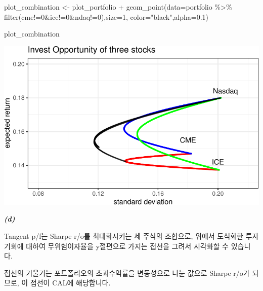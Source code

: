 \documentclass[
  a4paper,
  DIV=11,
  numbers=noendperiod]{scrreprt}
\newenvironment{Shaded}{\begin{snugshade}}{\end{snugshade}}
\newcommand{\AttributeTok}[1]{\textcolor[rgb]{0.40,0.45,0.13}{#1}}
\newcommand{\DecValTok}[1]{\textcolor[rgb]{0.68,0.00,0.00}{#1}}
\newcommand{\FloatTok}[1]{\textcolor[rgb]{0.68,0.00,0.00}{#1}}
\newcommand{\FunctionTok}[1]{\textcolor[rgb]{0.28,0.35,0.67}{#1}}
\newcommand{\NormalTok}[1]{\textcolor[rgb]{0.00,0.23,0.31}{#1}}
\newcommand{\OtherTok}[1]{\textcolor[rgb]{0.00,0.23,0.31}{#1}}
\newcommand{\SpecialCharTok}[1]{\textcolor[rgb]{0.37,0.37,0.37}{#1}}
\newcommand{\StringTok}[1]{\textcolor[rgb]{0.13,0.47,0.30}{#1}}
\begin{document}
\begin{Shaded}
\begin{Highlighting}[]
\NormalTok{plot\_combination }\OtherTok{\textless{}{-}}\NormalTok{ plot\_portfolio }\SpecialCharTok{+}
  \FunctionTok{geom\_point}\NormalTok{(}\AttributeTok{data=}\NormalTok{portfolio }\SpecialCharTok{\%\textgreater{}\%} \FunctionTok{filter}\NormalTok{(cme}\SpecialCharTok{!=}\DecValTok{0}\SpecialCharTok{\&}\NormalTok{ice}\SpecialCharTok{!=}\DecValTok{0}\SpecialCharTok{\&}\NormalTok{ndaq}\SpecialCharTok{!=}\DecValTok{0}\NormalTok{),}\AttributeTok{size=}\DecValTok{1}\NormalTok{,}
  \AttributeTok{color=}\StringTok{"black"}\NormalTok{,}\AttributeTok{alpha=}\FloatTok{0.1}\NormalTok{)}

\NormalTok{plot\_combination}
\end{Highlighting}
\end{Shaded}

\includegraphics{investment_hw2_files/figure-pdf/unnamed-chunk-6-1.pdf}

\textbf{\emph{(d)}}

Tangent p/f는 Sharpe r/o를 최대화시키는 세 주식의 조합으로, 위에서
도식화한 투자기회에 대하여 무위험이자율을 y절편으로 가지는 접선을 그려서
시각화할 수 있습니다.

접선의 기울기는 포트폴리오의 초과수익률을 변동성으로 나눈 값으로 Sharpe
r/o가 되므로, 이 접선이 CAL에 해당합니다.
\end{document}
